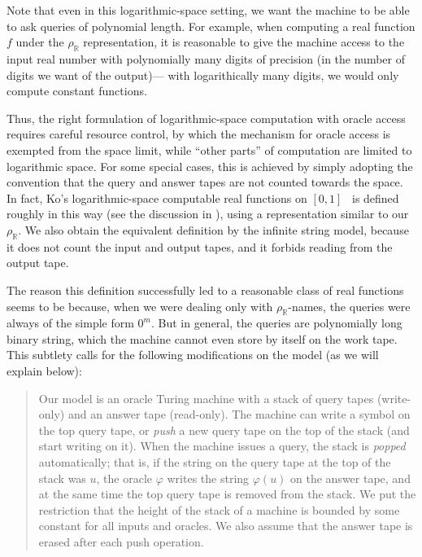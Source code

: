 \documentclass[conference]{IEEEtran}
\newcommand{\R}{\mathbb R}
\newcommand{\rhoR}{\rho _\R}
\theoremstyle{definition}
\theoremstyle{remark}
\begin{document}
Note that even in this logarithmic-space setting, 
we want the machine to be able to ask queries of polynomial length. 
For example, when computing a real function $f$ under the $\rhoR$ representation, 
it is reasonable to give the machine access to 
the input real number with polynomially many digits of precision 
(in the number of digits we want of the output)---%
with logarithically many digits, 
we would only compute constant functions. 

Thus, the right formulation of logarithmic-space computation with oracle access 
requires careful resource control, by which 
the mechanism for oracle access is exempted from the space limit, 
while ``other parts'' of computation are limited to logarithmic space. 
For some special cases, 
this is achieved by simply adopting the convention that 
the query and answer tapes 
are not counted towards the space. 
In fact, Ko's logarithmic-space computable real functions on $[0, 1]$~%
\cite[Chapter~4]{ko1991complexity} is defined roughly in this way
(see the discussion in \cite[pp.~121--122]{ko1991complexity}), 
using a representation similar to our $\rhoR$. 
We also obtain the equivalent definition 
by the infinite string model, 
because it does not count the input and output tapes, 
and it forbids reading from the output tape. 

The reason this definition successfully led to a reasonable class of real functions
seems to be because, 
when we were dealing only with $\rhoR$-names, 
the queries were always of the simple form $0 ^m$. 
But in general, 
the queries are polynomially long binary string, 
which the machine cannot even store by itself on the work tape. 
This subtlety calls for the following modifications on the model
(as we will explain below): 

\begin{quote}
Our model is an oracle Turing machine 
with a stack of query tapes (write-only) and an answer tape (read-only).
The machine can write a symbol on the top query tape, or 
\emph{push} a new query tape on the top of the stack (and start writing on it).
When the machine issues a query, the stack is \emph{popped} automatically; 
that is, 
if the string on the query tape at the top of the stack was $u$, 
the oracle $\varphi$ writes the string $\varphi (u)$ on the answer tape, 
and at the same time the top query tape is removed from the stack. 
We put the restriction that the height of the stack of a machine is 
bounded by some constant for all inputs and oracles.
We also assume that 
the answer tape is erased after each push operation.
\end{quote}
\end{document}
